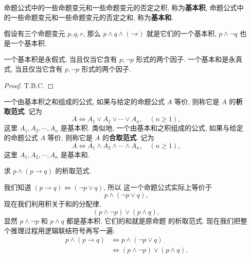 \documentclass[10pt,UTF8]{book} %
\begin{document}
\begin{definition}
    命题公式中的一些命题变元和一些命题变元的否定之积, 称为\textbf{基本积},
    命题公式中的一些命题变元和一些命题变元的否定之和, 称为\textbf{基本和}.
\end{definition}

\begin{example}
    假设有三个命题变元 $p,q,r$, 那么 $p \wedge q \wedge (\lnot r)$ 就是它们的一个基本积,
    $p \wedge \lnot q$ 也是一个基本积.
\end{example}

\begin{thm}
    一个基本积是永假式, 当且仅当它含有 $p, \lnot p$ 形式的两个因子.
    一个基本和是永真式, 当且仅当它含有 $p, \lnot p$ 形式的两个因子.
    \begin{proof}
        T.B.C.
    \end{proof}
\end{thm}

\begin{definition}
    一个由基本积之和组成的公式, 如果与给定的命题公式 $A$ 等价, 则称它是 $A$ 的\textbf{析取范式}.
    记为 \[ A \iff A_1 \vee A_2 \vee \cdots \vee A_n, \quad (n \geqslant 1), \]
    这里 $A_1, A_2, \cdots, A_n$ 是基本积.
    类似地, 一个由基本和之积组成的公式, 如果与给定的命题公式 $A$ 等价, 则称它是 $A$
    的\textbf{合取范式}. 记为 \[ A \iff A_1 \wedge A_2 \wedge \cdots \wedge A_n, \quad (n \geqslant 1), \]
    这里 $A_1, A_2, \cdots, A_n$ 是基本和.
\end{definition}

\begin{example}
    求 $p \wedge (p \longrightarrow q)$ 的析取范式.
    \begin{sol}
        我们知道 $(p \longrightarrow q) \iff (\lnot p \vee q)$, 所以
        这一个命题公式实际上等价于
        \[ p \wedge (\lnot p \vee q), \]
        现在我们利用积关于和的分配律,
        \[ (p\wedge \lnot p) \vee (p \wedge q), \]
        显然 $p \wedge \lnot p$ 和 $p \wedge q$ 都是基本积. 它们的和就是原命题
        的析取范式. 现在我们把整个推理过程用逻辑联结符号再写一遍:
        \[ \begin{aligned}
            p \wedge (p \longrightarrow q) & \iff 
            p \wedge (\lnot p \vee q) \\ 
            & \iff (p\wedge \lnot p) \vee (p \wedge q).
        \end{aligned} \]
    \end{sol}
\end{example}
\end{document}
